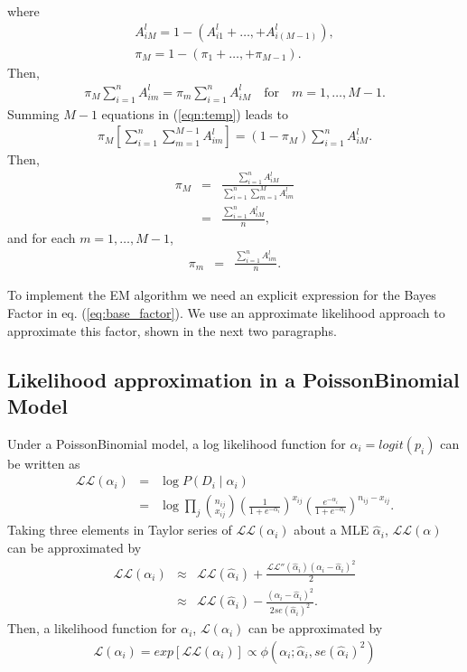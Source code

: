 \documentclass[12pt,letterpaper]{article}
\newcommand{\given}{\mid}
\newcommand{\Normal}{\mathcal{N}}
\newcommand{\like}{\mathcal{L}}
\newcommand{\loglike}{\mathcal{L}\mathcal{L}}
\begin{document}
where
\begin{eqnarray}
	A_{iM}^l = 1 - (A_{i1}^l + \ldots, + A_{i(M-1)}^l),\\
	\pi_{M} = 1 - (\pi_{1} + \ldots, + \pi_{M-1}).
\end{eqnarray}
Then,
\begin{eqnarray}
\pi_M \sum_{i=1}^nA_{im}^l = \pi_m \sum_{i=1}^nA_{iM}^l \quad \text{for} \quad m = 1, \ldots, M-1. \label{eqn:temp}
\end{eqnarray}
Summing $M-1$ equations in (\ref{eqn:temp}) leads to
\begin{eqnarray}
	\pi_M [\sum_{i=1}^n\sum_{m=1}^{M-1}A_{im}^l] = (1-\pi_M) \sum_{i=1}^nA_{iM}^l.
\end{eqnarray}
Then,
\begin{eqnarray}
	\pi_M  &=& \frac{\sum_{i=1}^nA_{iM}^l} {\sum_{i=1}^n\sum_{m=1}^{M}A_{im}^l}\\
		  &=& \frac{\sum_{i=1}^nA_{iM}^l}{n},
\end{eqnarray}
and for each $m= 1, \ldots, M-1$,
\begin{eqnarray}
	\pi_m  &=& \frac{\sum_{i=1}^nA_{im}^l}{n}.
\end{eqnarray}

To implement the EM algorithm we need an explicit expression for the Bayes Factor in eq. (\ref{eq:base_factor}).
We use an approximate likelihood approach to approximate this factor, shown in the next two paragraphs.

\subsection{Likelihood approximation in a PoissonBinomial Model}
\label{sec:app_PB_like}
Under a PoissonBinomial model, a log likelihood function for $\alpha_i = logit(p_i)$ can be written as
\begin{eqnarray}
\loglike(\alpha_i) &=& \log{P(D_i \given \alpha_i)}\\
		&=& \log{\prod_j{{n_{ij} \choose x_{ij}} \left(\frac{1}{1+e^{-\alpha_i}}\right)^{x_{ij}} \left(\frac{e^{-\alpha_i}}{1+e^{-\alpha_i}}\right)^{n_{ij} - x_{ij}}}}.
\end{eqnarray}
Taking three elements in Taylor series of $\loglike(\alpha_i)$ about a MLE $\hat{\alpha}_i$, $\loglike(\alpha)$ can be approximated by
\begin{eqnarray}
\loglike(\alpha_i) &\approx& \loglike(\hat{\alpha}_i) + \frac{\loglike''(\hat{\alpha}_i)(\alpha_i - \hat{\alpha}_i)^2}{2}\\
		&\approx& \loglike(\hat{\alpha}_i) - \frac{(\alpha_i - \hat{\alpha}_i)^2}{2se(\hat{\alpha}_i)^2}.
\end{eqnarray}
Then, a likelihood function for $\alpha_i$, $\like(\alpha_i)$ can be approximated by
\begin{eqnarray}
\like(\alpha_i) = exp[\loglike(\alpha_i)] \propto \phi(\alpha_i ; \hat{\alpha}_i, se(\hat{\alpha}_i)^2) %
\end{eqnarray}
\end{document}
